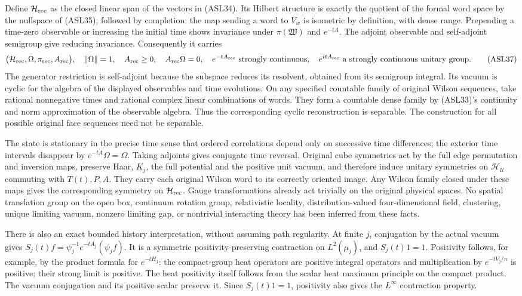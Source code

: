 \documentclass[11pt]{article}
\begin{document}
Define \(\mathcal H_{\rm rec}\) as the closed linear span of the vectors in (ASL34). Its Hilbert structure is exactly the quotient of the formal word space by the nullspace of (ASL35), followed by completion: the map sending a word to \(V_w\) is isometric by definition, with dense range. Prepending a time-zero observable or increasing the initial time shows invariance under \(\pi(\mathfrak W)\) and \(e^{-tA}\). The adjoint observable and self-adjoint semigroup give reducing invariance. Consequently it carries
\[
 \bigl(\mathcal H_{\rm rec},\Omega,\pi_{\rm rec},A_{\rm rec}\bigr),\quad
 \|\Omega\|=1,\quad A_{\rm rec}\ge0,\quad A_{\rm rec}\Omega=0,
 \quad e^{-tA_{\rm rec}}\text{ strongly continuous},
 \quad e^{itA_{\rm rec}}\text{ a strongly continuous unitary group}.
 \tag{ASL37}
\]
The generator restriction is self-adjoint because the subspace reduces its resolvent, obtained from its semigroup integral. Its vacuum is cyclic for the algebra of the displayed observables and time evolutions. On any specified countable family of original Wilson sequences, take rational nonnegative times and rational complex linear combinations of words. They form a countable dense family by (ASL33)'s continuity and norm approximation of the observable algebra. Thus the corresponding cyclic reconstruction is separable. The construction for all possible original face sequences need not be separable.

The state is stationary in the precise time sense that ordered correlations depend only on successive time differences; the exterior time intervals disappear by \(e^{-tA}\Omega=\Omega\). Taking adjoints gives conjugate time reversal. Original cube symmetries act by the full edge permutation and inversion maps, preserve Haar, \(K_j\), the full potential and the positive unit vacuum, and therefore induce unitary symmetries on \(\mathcal H_{\mathcal U}\) commuting with \(T(t),P,A\). They carry each original Wilson word to its correctly oriented image. Any Wilson family closed under these maps gives the corresponding symmetry on \(\mathcal H_{\rm rec}\). Gauge transformations already act trivially on the original physical spaces. No spatial translation group on the open box, continuum rotation group, relativistic locality, distribution-valued four-dimensional field, clustering, unique limiting vacuum, nonzero limiting gap, or nontrivial interacting theory has been inferred from these facts.

There is also an exact bounded history interpretation, without assuming path regularity. At finite \(j\), conjugation by the actual vacuum gives \(S_j(t)f=\psi_j^{-1}e^{-tA_j}(\psi_jf)\). It is a symmetric positivity-preserving contraction on \(L^2(\mu_j)\), and \(S_j(t)1=1\). Positivity follows, for example, by the product formula for \(e^{-tH_j}\): the compact-group heat operators are positive integral operators and multiplication by \(e^{-tV_j/n}\) is positive; their strong limit is positive. The heat positivity itself follows from the scalar heat maximum principle on the compact product. The vacuum conjugation and its positive scalar preserve it. Since \(S_j(t)1=1\), positivity also gives the \(L^\infty\) contraction property.
\end{document}
